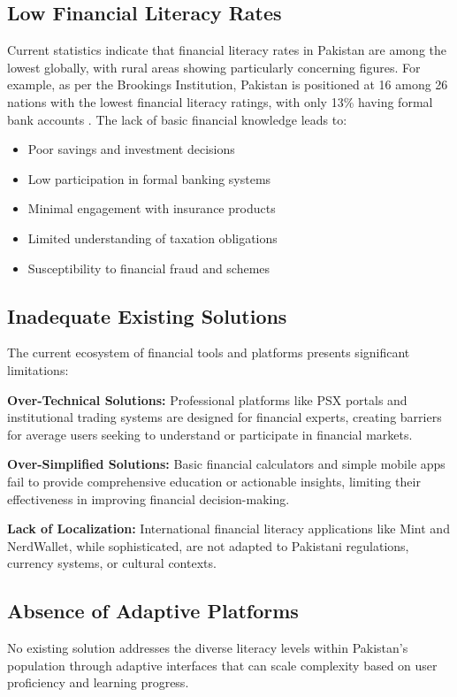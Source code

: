 \documentclass[conference]{IEEEtran}
\begin{document}
\subsection{Low Financial Literacy Rates}
Current statistics indicate that financial literacy rates in Pakistan are among the lowest globally, with rural areas showing particularly concerning figures. For example, as per the Brookings Institution, Pakistan is positioned at 16 among 26 nations with the lowest financial literacy ratings, with only 13\% having formal bank accounts \cite{brookings2024}. The lack of basic financial knowledge leads to:
\begin{itemize}
    \item Poor savings and investment decisions
    \item Low participation in formal banking systems
    \item Minimal engagement with insurance products
    \item Limited understanding of taxation obligations
    \item Susceptibility to financial fraud and schemes
\end{itemize}

\subsection{Inadequate Existing Solutions}
The current ecosystem of financial tools and platforms presents significant limitations:

\textbf{Over-Technical Solutions:} Professional platforms like PSX portals and institutional trading systems are designed for financial experts, creating barriers for average users seeking to understand or participate in financial markets.

\textbf{Over-Simplified Solutions:} Basic financial calculators and simple mobile apps fail to provide comprehensive education or actionable insights, limiting their effectiveness in improving financial decision-making.

\textbf{Lack of Localization:} International financial literacy applications like Mint and NerdWallet, while sophisticated, are not adapted to Pakistani regulations, currency systems, or cultural contexts.

\subsection{Absence of Adaptive Platforms}
No existing solution addresses the diverse literacy levels within Pakistan's population through adaptive interfaces that can scale complexity based on user proficiency and learning progress.
\end{document}
